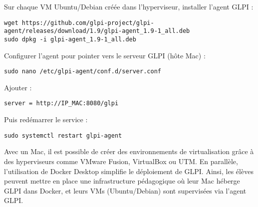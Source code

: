 \documentclass[11pt,a4paper]{article}
\begin{document}
\begin{tcolorbox}[title={6. Supervision des VMs avec l’agent GLPI}]
Sur chaque VM Ubuntu/Debian créée dans l’hyperviseur, installer l’agent GLPI :  
\begin{verbatim}
wget https://github.com/glpi-project/glpi-agent/releases/download/1.9/glpi-agent_1.9-1_all.deb
sudo dpkg -i glpi-agent_1.9-1_all.deb
\end{verbatim}

Configurer l’agent pour pointer vers le serveur GLPI (hôte Mac) :  
\begin{verbatim}
sudo nano /etc/glpi-agent/conf.d/server.conf
\end{verbatim}

Ajouter :
\begin{verbatim}
server = http://IP_MAC:8080/glpi
\end{verbatim}

Puis redémarrer le service :
\begin{verbatim}
sudo systemctl restart glpi-agent
\end{verbatim}
\end{tcolorbox}

\begin{tcolorbox}[title={Conclusion}]
Avec un Mac, il est possible de créer des environnements de virtualisation grâce à des hyperviseurs comme VMware Fusion, VirtualBox ou UTM.  
En parallèle, l’utilisation de Docker Desktop simplifie le déploiement de GLPI.  
Ainsi, les élèves peuvent mettre en place une infrastructure pédagogique où leur Mac héberge GLPI dans Docker, et leurs VMs (Ubuntu/Debian) sont supervisées via l’agent GLPI.
\end{tcolorbox}
\end{document}
